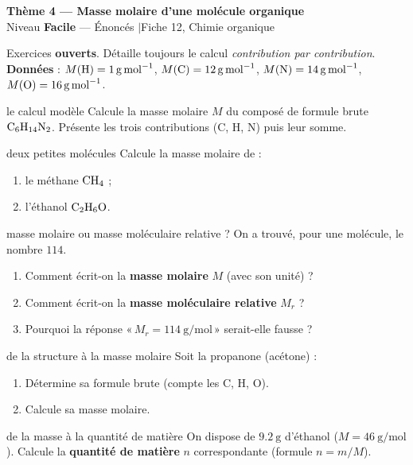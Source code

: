 \documentclass[11pt,a4paper]{article}
\newcommand{\banner}[2]{%
\begin{tcolorbox}[enhanced,colback=primary,colframe=primary,arc=5pt,boxrule=0pt,
   left=5mm,right=5mm,top=2.5mm,bottom=2.5mm,coltext=white]
{\large\bfseries #1}\\[1pt]{\small #2}
\end{tcolorbox}\vspace{2pt}}
\begin{document}
\banner{Thème 4 — Masse molaire d'une molécule organique}{Niveau \textbf{Facile} — Énoncés \quad$\vert$\quad Fiche 12, Chimie organique}

\begin{consigne}
Exercices \textbf{ouverts}. Détaille toujours le calcul \emph{contribution par contribution}. \textbf{Données} : $M(\ce{H})=\qty{1}{\g\per\mol}$, $M(\ce{C})=\qty{12}{\g\per\mol}$, $M(\ce{N})=\qty{14}{\g\per\mol}$, $M(\ce{O})=\qty{16}{\g\per\mol}$.
\end{consigne}

\begin{exo}{le calcul modèle}
Calcule la masse molaire $M$ du composé de formule brute $\ce{C6H14N2}$. Présente les trois contributions (C, H, N) puis leur somme.
\end{exo}

\begin{exo}{deux petites molécules}
Calcule la masse molaire de :
\begin{enumerate}[label=\textbf{\alph*)},leftmargin=2em,itemsep=1pt]
  \item le méthane $\ce{CH4}$ ;
  \item l'éthanol $\ce{C2H6O}$.
\end{enumerate}
\end{exo}

\begin{exo}{masse molaire ou masse moléculaire relative ?}
On a trouvé, pour une molécule, le nombre $114$.
\begin{enumerate}[label=\textbf{\alph*)},leftmargin=2em,itemsep=1pt]
  \item Comment écrit-on la \textbf{masse molaire} $M$ (avec son unité) ?
  \item Comment écrit-on la \textbf{masse moléculaire relative} $M_r$ ?
  \item Pourquoi la réponse «\,$M_r = \qty{114}{\g\per\mol}$\,» serait-elle fausse ?
\end{enumerate}
\end{exo}

\begin{exo}{de la structure à la masse molaire}
Soit la propanone (acétone) :
\begin{center}\end{center}
\begin{enumerate}[label=\textbf{\alph*)},leftmargin=2em,itemsep=1pt]
  \item Détermine sa formule brute (compte les C, H, O).
  \item Calcule sa masse molaire.
\end{enumerate}
\end{exo}

\begin{exo}{de la masse à la quantité de matière}
On dispose de $\qty{9,2}{\g}$ d'éthanol ($M=\qty{46}{\g\per\mol}$). Calcule la \textbf{quantité de matière} $n$ correspondante (formule $n=m/M$).
\end{exo}
\end{document}
